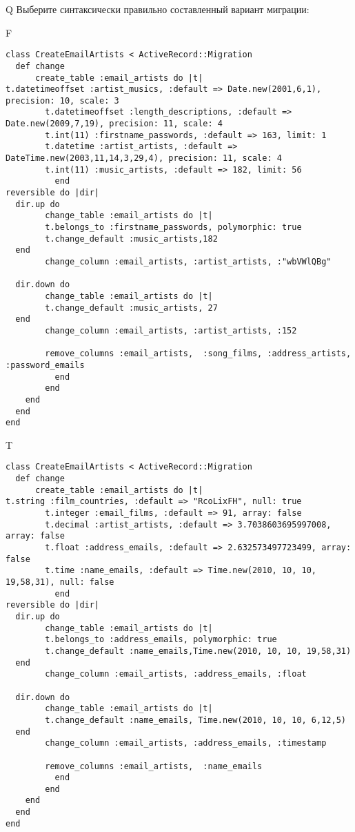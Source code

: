 Q
Выберите синтаксически правильно составленный вариант миграции:

F
\begin{verbatim}
class CreateEmailArtists < ActiveRecord::Migration
  def change
	  create_table :email_artists do |t|
t.datetimeoffset :artist_musics, :default => Date.new(2001,6,1), precision: 10, scale: 3
		t.datetimeoffset :length_descriptions, :default => Date.new(2009,7,19), precision: 11, scale: 4
		t.int(11) :firstname_passwords, :default => 163, limit: 1
		t.datetime :artist_artists, :default => DateTime.new(2003,11,14,3,29,4), precision: 11, scale: 4
		t.int(11) :music_artists, :default => 182, limit: 56
		  end
reversible do |dir|
  dir.up do
		change_table :email_artists do |t|
		t.belongs_to :firstname_passwords, polymorphic: true
 		t.change_default :music_artists,182
  end
 		change_column :email_artists, :artist_artists, :"wbVWlQBg"
   
  dir.down do
		change_table :email_artists do |t|
		t.change_default :music_artists, 27
  end
 		change_column :email_artists, :artist_artists, :152
   
		remove_columns :email_artists,  :song_films, :address_artists, :password_emails 
	      end
	    end
    end 
  end
end

\end{verbatim}

T
\begin{verbatim}
class CreateEmailArtists < ActiveRecord::Migration
  def change
	  create_table :email_artists do |t|
t.string :film_countries, :default => "RcoLixFH", null: true
		t.integer :email_films, :default => 91, array: false
		t.decimal :artist_artists, :default => 3.7038603695997008, array: false
		t.float :address_emails, :default => 2.632573497723499, array: false
		t.time :name_emails, :default => Time.new(2010, 10, 10, 19,58,31), null: false
		  end
reversible do |dir|
  dir.up do
		change_table :email_artists do |t|
		t.belongs_to :address_emails, polymorphic: true
 		t.change_default :name_emails,Time.new(2010, 10, 10, 19,58,31)
  end
 		change_column :email_artists, :address_emails, :float
   
  dir.down do
		change_table :email_artists do |t|
		t.change_default :name_emails, Time.new(2010, 10, 10, 6,12,5)
  end
 		change_column :email_artists, :address_emails, :timestamp
   
		remove_columns :email_artists,  :name_emails 
	      end
	    end
    end 
  end
end

\end{verbatim}

